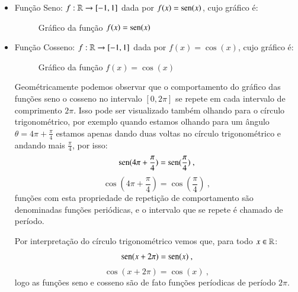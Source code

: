   \begin{itemize}
  \item Função Seno: $f: \mathbb{R} \rightarrow [-1, 1]$ dada por $f(x)= \operatorname{sen} (x)$, cujo gráfico é:

  \begin{figure}[H]
  \centering
    \caption{Gráfico da função $f(x)= \operatorname{sen}(x)$}
  \end{figure}

  \item Função Cosseno: $f: \mathbb{R} \rightarrow [-1, 1]$ dada por $f(x)= \cos(x)$, cujo gráfico é:

  \begin{figure}[H]
  \centering
    \caption{Gráfico da função $f(x)= \cos(x)$}
  \end{figure}

  Geométricamente podemos observar que o comportamento do gráfico das funções seno o cosseno no intervalo $[0, 2\pi]$ se repete em cada intervalo de comprimento $2\pi$. Isso pode ser visualizado também olhando para o círculo trigonométrico, por exemplo quando estamos olhando para um ângulo $\theta= 4\pi + \frac{\pi}{4}$ estamos apenas dando duas voltas no círculo trigonométrico e andando mais $\frac{\pi}{4}$, por isso:
  \[\operatorname{sen}(4\pi + \frac{\pi}{4})= \operatorname{sen}(\frac{\pi}{4}) \ ,\]
  \[\cos(4\pi + \frac{\pi}{4})= \cos(\frac{\pi}{4}) \ , \]
  funções com esta propriedade de repetição de comportamento são denominadas funções periódicas, e o intervalo que se repete é chamado de período.

  Por interpretação do círculo trigonométrico vemos que, para todo $x \in \mathbb{R}$:
  \[\operatorname{sen}(x + 2 \pi)= \operatorname{sen}(x) \ ,\]
  \[\cos(x + 2\pi)= \cos(x) \ , \]
  logo as funções seno e cosseno são de fato funções períodicas de período $2\pi$.


\end{itemize}

